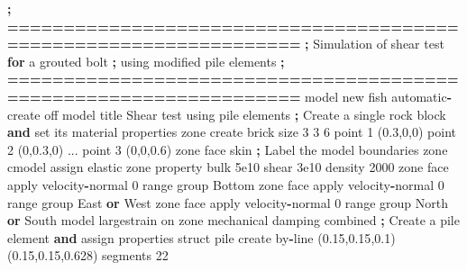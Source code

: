 \documentclass[a4paper, nobind]{templates/ociamthesis}
\newenvironment{Shaded}{\begin{snugshade}}{\end{snugshade}}
\newcommand{\BuiltInTok}[1]{#1}
\newcommand{\ControlFlowTok}[1]{\textcolor[rgb]{0.13,0.29,0.53}{\textbf{#1}}}
\newcommand{\DecValTok}[1]{\textcolor[rgb]{0.00,0.00,0.81}{#1}}
\newcommand{\FloatTok}[1]{\textcolor[rgb]{0.00,0.00,0.81}{#1}}
\newcommand{\KeywordTok}[1]{\textcolor[rgb]{0.13,0.29,0.53}{\textbf{#1}}}
\newcommand{\NormalTok}[1]{#1}
\newcommand{\OperatorTok}[1]{\textcolor[rgb]{0.81,0.36,0.00}{\textbf{#1}}}
\newcommand{\StringTok}[1]{\textcolor[rgb]{0.31,0.60,0.02}{#1}}
\renewenvironment{Shaded}
{
  \vspace{10pt}%
  \begin{snugshade}%
}{%
  \end{snugshade}%
  \vspace{8pt}%
}
\begin{document}
\begin{Shaded}
\begin{Highlighting}[]
    \OperatorTok{;} \OperatorTok{==================================================================}
    \OperatorTok{;}\NormalTok{   Simulation of shear test }\ControlFlowTok{for}\NormalTok{ a grouted bolt}
    \OperatorTok{;}\NormalTok{   using modified pile elements}
    \OperatorTok{;} \OperatorTok{==================================================================}
\NormalTok{    model new}
\NormalTok{    fish automatic}\OperatorTok{{-}}\NormalTok{create off}
\NormalTok{    model title }\StringTok{\textquotesingle{}Shear test using pile elements\textquotesingle{}}
    \OperatorTok{;}\NormalTok{ Create a single rock block }\KeywordTok{and} \BuiltInTok{set}\NormalTok{ its material properties}
\NormalTok{    zone create brick size }\DecValTok{3} \DecValTok{3} \DecValTok{6}\NormalTok{ point }\DecValTok{1}\NormalTok{ (}\FloatTok{0.3}\NormalTok{,}\DecValTok{0}\NormalTok{,}\DecValTok{0}\NormalTok{) point }\DecValTok{2}\NormalTok{ (}\DecValTok{0}\NormalTok{,}\FloatTok{0.3}\NormalTok{,}\DecValTok{0}\NormalTok{) ...}
\NormalTok{                                 point }\DecValTok{3}\NormalTok{ (}\DecValTok{0}\NormalTok{,}\DecValTok{0}\NormalTok{,}\FloatTok{0.6}\NormalTok{)}
\NormalTok{    zone face skin }\OperatorTok{;}\NormalTok{ Label the model boundaries}
\NormalTok{    zone cmodel assign elastic}
\NormalTok{    zone }\BuiltInTok{property}\NormalTok{ bulk }\FloatTok{5e10}\NormalTok{ shear }\FloatTok{3e10}\NormalTok{ density }\DecValTok{2000}
\NormalTok{    zone face }\BuiltInTok{apply}\NormalTok{ velocity}\OperatorTok{{-}}\NormalTok{normal }\DecValTok{0} \BuiltInTok{range}\NormalTok{ group }\StringTok{\textquotesingle{}Bottom\textquotesingle{}}
\NormalTok{    zone face }\BuiltInTok{apply}\NormalTok{ velocity}\OperatorTok{{-}}\NormalTok{normal }\DecValTok{0} \BuiltInTok{range}\NormalTok{ group }\StringTok{\textquotesingle{}East\textquotesingle{}} \KeywordTok{or} \StringTok{\textquotesingle{}West\textquotesingle{}}
\NormalTok{    zone face }\BuiltInTok{apply}\NormalTok{ velocity}\OperatorTok{{-}}\NormalTok{normal }\DecValTok{0} \BuiltInTok{range}\NormalTok{ group }\StringTok{\textquotesingle{}North\textquotesingle{}} \KeywordTok{or} \StringTok{\textquotesingle{}South\textquotesingle{}}
\NormalTok{    model largestrain on}
\NormalTok{    zone mechanical damping combined}
    \OperatorTok{;}\NormalTok{ Create a pile element }\KeywordTok{and}\NormalTok{ assign properties}
\NormalTok{    struct pile create by}\OperatorTok{{-}}\NormalTok{line (}\FloatTok{0.15}\NormalTok{,}\FloatTok{0.15}\NormalTok{,}\FloatTok{0.1}\NormalTok{) (}\FloatTok{0.15}\NormalTok{,}\FloatTok{0.15}\NormalTok{,}\FloatTok{0.628}\NormalTok{) segments }\DecValTok{22}

\end{Highlighting}
\end{Shaded}
\end{document}

